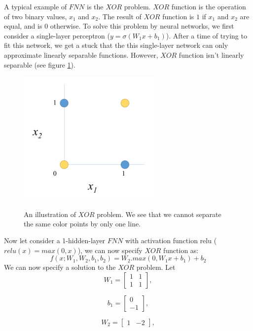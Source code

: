 A typical example of $\displaystyle FNN$ is the $\displaystyle XOR$ problem. $\displaystyle XOR$ function is the operation of two binary values, $\displaystyle x_1$ and $\displaystyle x_2$. The result of $\displaystyle XOR$ function is $\displaystyle 1$ if $\displaystyle x_1$ and $\displaystyle x_2$ are equal, and is $\displaystyle 0$ otherwise. To solve this problem by neural networks, we first consider a single-layer perceptron ($\displaystyle y = \sigma(W_1x + b_1)$). After a time of trying to fit this network, we get a stuck that the this single-layer network can only approximate linearly separable functions. However, $\displaystyle XOR$ function isn't linearly separable (see figure \ref{fig:xor}).
\begin{figure}
    \caption{An illustration of $\displaystyle XOR$ problem. We see that we cannot separate the same color points by only one line.}
    \includegraphics[width=.4\textwidth]{figures/chap2/xor-graph.png}
    \label{fig:xor}
\end{figure}

Now let consider a 1-hidden-layer $\displaystyle FNN$ with activation function relu ($\displaystyle relu(x) = max(0, x)$), we can now specify $\displaystyle XOR$ function as:
\[ f(x; W_1, W_2, b_1, b_2) = W_2.max(0, W_1x + b_1) + b_2 \label{equation_xor} \]
We can now specify a solution to the $\displaystyle XOR$ problem. Let
\[ W_1 = 
\begin{bmatrix}
    1 & 1 \\
    1 & 1
\end{bmatrix}, \]

\[ b_1 =
\begin{bmatrix}
    0 \\
    -1
\end{bmatrix}, \]

\[ W_2 =
\begin{bmatrix}
    1 & -2
\end{bmatrix}, \]

